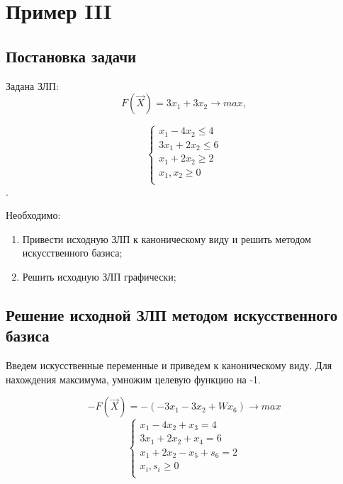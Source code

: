 \section{Пример III}

\subsection{Постановка задачи}
\renewcommand{\labelenumi}{\arabic{enumi})}
Задана ЗЛП:
\begin{equation}
	F(\vec{X}) = 3x_1 + 3x_2 \to max,
\end{equation}

\begin{equation}
\begin{cases}
x_1 - 4x_2 \le 4 \\
3x_1 + 2x_2 \le 6 \\
x_1 + 2x_2 \ge 2 \\
x_1, x_2 \ge 0 \\
\end{cases}
\end{equation}.

Необходимо:
\begin{enumerate}
\item Привести исходную ЗЛП к каноническому виду и решить методом искусственного базиса;
\item Решить исходную ЗЛП графически;
\end{enumerate}

\subsection{Решение исходной ЗЛП методом искусственного базиса}
Введем искусственные переменные и приведем к каноническому виду.
Для нахождения максимума, умножим целевую функцию на -1.

$$-F(\vec{X}) = -(-3x_1-3x_2+Wx_6) \to max$$
\begin{equation}
\label{cannonical}
\begin{cases}
x_1-4x_2+x_3=4\\
3x_1+2x_2+x_4=6\\
x_1+2x_2-x_5+ s_6=2\\
x_i, s_i \ge 0 \\
\end{cases}
\end{equation}

